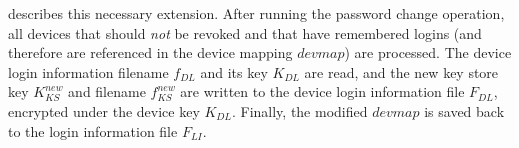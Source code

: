  describes this necessary extension.  
After running the password change operation, all devices that should \emph{not} 
be revoked and that have remembered logins (and therefore are 
referenced in the device mapping $devmap$) are processed.
The device login information filename $f_{DL}$ and its key $K_{DL}$ 
are read, and the new key store key $K_{KS}^{new}$ and filename $f_{KS}^{new}$ 
are written to the device login information file $F_{DL}$, encrypted under the 
device key $K_{DL}$. Finally, the modified $devmap$ is saved back to the 
login information file $F_{LI}$.



